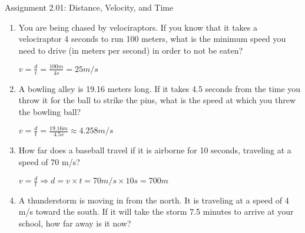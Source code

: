 \documentclass[letterpaper, 12pt]{article}
\begin{document}


\begin{center} Assignment 2.01: Distance, Velocity, and Time
\end{center}





\begin{enumerate}

\item You are being chased by velociraptors.  If you know that it takes a velociraptor 4 seconds to run 100 meters, what is the minimum speed you need to drive (in meters per second) in order to not be eaten?
\color{red}
\begin{center} $ v = \frac{d}{t} = \frac{100m}{4s} = 25 m/s $
	


\end{center}

\vspace{0.15in}
\color{black}
\item A bowling alley is 19.16 meters long.  If it takes 4.5 seconds from the time you throw it for the ball to strike the pins, what is the speed at which you threw the bowling ball?
\color{red}
\begin{center} $ v = \frac{d}{t} = \frac{19.16m}{4.5s} \approx 4.258 m/s $
	
\end{center}


\vspace{0.15in}
\color{black}
\item How far does a baseball travel if it is airborne for 10 seconds, traveling at a speed of 70 m/s?
\color{red}

\begin{center} $ v = \frac{d}{t} \Longrightarrow d = v \times t = 70 m/s \times 10 s = 700 m $
	
\end{center}


\vspace{0.15in}
\color{black}

\item A thunderstorm is moving in from the north.  It is traveling at a speed of 4 m/s toward the south.  If it will take the storm 7.5 minutes to arrive at your school, how far away is it now?


\end{enumerate}
\end{document}
